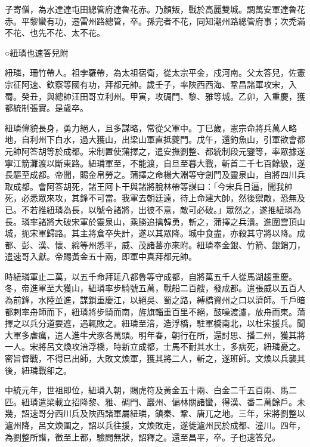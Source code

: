 \begin{pinyinscope}
 子寄僧，為水達達屯田總管府達魯花赤。乃顏叛，戰於高麗雙城。調萬安軍達魯花赤。平黎蠻有功，遷雷州路總管，卒。孫完者不花，同知潮州路總管府事；次禿滿不花、也先不花、太不花。



 ○紐璘也速答兒附



 紐璘，珊竹帶人。祖孛羅帶，為太祖宿衛，從太宗平金，戍河南。父太答兒，佐憲宗征阿速、欽察等國有功，拜都元帥。歲壬子，率陜西西海、鞏昌諸軍攻宋，入蜀。癸丑，與總帥汪田哥立利州。甲寅，攻碉門、黎、雅等城。乙卯，入重慶，獲都統制張實。是歲卒。



 紐璘偉貌長身，勇力絕人，且多謀略，常從父軍中。丁巳歲，憲宗命將兵萬人略地，自利州下白水，過大獲山，出梁山軍直抵夔門。戊午，還釣魚山，引軍欲會都元帥阿答胡等於成都。宋制置使蒲擇之，遣安撫劉整、都統制段元鑒等，率眾據遂寧江箭灘渡以斷東路。紐璘軍至，不能渡，自旦至暮大戰，斬首二千七百餘級，遂長驅至成都。帝聞，賜金帛勞之。蒲擇之命楊大淵等守劍門及靈泉山，自將四川兵取成都。會阿答胡死，諸王阿卜干與諸將脫林帶等謀曰：「今宋兵日逼，聞我帥死，必悉眾來攻，其鋒不可當。我軍去朝廷遠，待上命建大帥，然後禦敵，恐無及已。不若推紐璘為長，以號令諸將，出彼不意，敵可必破。」眾然之，遂推紐璘為長。璘率諸將大破宋軍於靈泉山，乘勝追擒韓勇，斬之，蒲擇之兵潰。進圍雲頂山城，扼宋軍歸路。其主將倉卒失計，遂以其眾降。城中食盡，亦殺其守將以降。成都、彭、漢、懷、綿等州悉平，威、茂諸蕃亦來附。紐璘奉金銀、竹箭、銀銷刀，遣速哥入獻。帝賜黃金五十兩，即軍中真拜都元帥。



 時紐璘軍止二萬，以五千命拜延八都魯等守成都，自將萬五千人從馬湖趨重慶。冬，帝進軍至大獲山，紐璘率步騎號五萬，戰船二百艘，發成都。遣張威以五百人為前鋒，水陸並進，謀鎖重慶江，以絕吳、蜀之路，縛橋資州之口以濟師。千戶暗都剌率舟師而下，紐璘將步騎而南，旌旗輜重百里不絕，鼓噪渡瀘，放舟而東。蒲擇之以兵分道要遮，遇輒敗之。紐璘至涪，造浮橋，駐軍橋南北，以杜宋援兵。聞大軍多虐癘，遣人進牛犬豕各萬頭。明年春，朝行在所，還討思、播二州，獲其將一人。宋將呂文煥攻涪浮橋，時新立成都，士馬不耐其水土，多病死，紐璘憂之。密旨督戰，不得已出師，大敗文煥軍，獲其將二人，斬之，遂班師。文煥以兵襲其後，紐璘戰卻之。



 中統元年，世祖即位，紐璘入朝，賜虎符及黃金五十兩、白金二千五百兩、馬二匹。紐璘遣梁載立招降黎、雅、碉門、巖州、偏林關諸蠻，得漢、番二萬餘戶。未幾，詔速哥分西川兵及陜西諸軍屬紐璘，鎮秦、鞏、唐兀之地。三年，宋將劉整以瀘州降，呂文煥圍之，詔以兵往援，文煥敗走，遂徙瀘州民於成都、潼川。四年，為劉整所譖，徵至上都，驗問無狀，詔釋之。還至昌平，卒。子也速答兒。




\end{pinyinscope}
